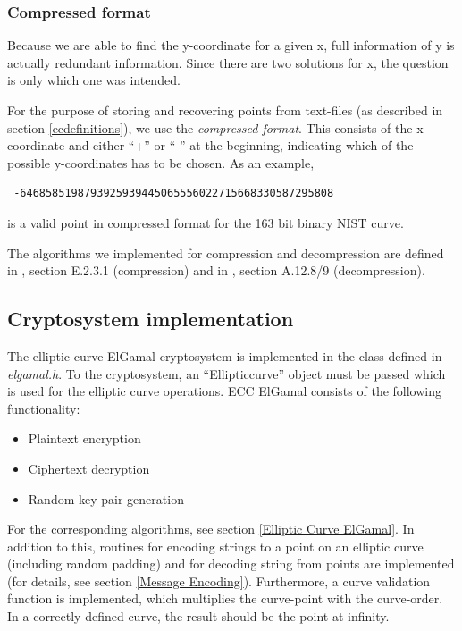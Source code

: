 \documentclass[11pt,english]{article}
\begin{document}
\subsubsection{Compressed format}
\label{Compressed format}
Because we are able to find the y-coordinate for a given x, full information of y is actually redundant information. Since there are two solutions for x, the question is only which one was intended.

For the purpose of storing and recovering points from text-files (as described in section \ref{ecdefinitions}), we use the \emph{compressed format}. This consists of the x-coordinate and either ``+'' or ``-'' at the beginning, indicating which of the possible y-coordinates has to be chosen. As an example,
\begin{verbatim}
 -6468585198793925939445065556022715668330587295808
\end{verbatim}
is a valid point in compressed format for the 163 bit binary NIST curve.

The algorithms we implemented for compression and decompression are defined in \cite{point-compress}, section E.2.3.1 (compression) and in \cite{point-decompress}, section A.12.8/9 (decompression).

\subsection{Cryptosystem implementation}
The elliptic curve ElGamal cryptosystem is implemented in the class defined in \emph{elgamal.h}. To the cryptosystem, an ``Ellipticcurve'' object must be passed which is used for the elliptic curve operations. ECC ElGamal consists of the following functionality:

\begin{itemize}
 \item Plaintext encryption
 \item Ciphertext decryption
 \item Random key-pair generation
\end{itemize}

For the corresponding algorithms, see section \ref{Elliptic Curve ElGamal}. In addition to this, routines for encoding strings to a point on an elliptic curve (including random padding) and for decoding string from points are implemented (for details, see section \ref{Message Encoding}). Furthermore, a curve validation function is implemented, which multiplies the curve-point with the curve-order. In a correctly defined curve, the result should be the point at infinity.
\end{document}
